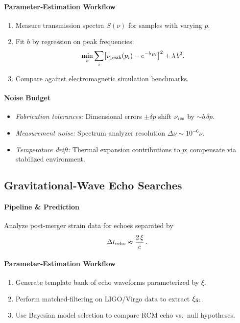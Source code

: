 \paragraph{Parameter‐Estimation Workflow}
\begin{enumerate}
  \item Measure transmission spectra $S(\nu)$ for samples with varying $p$.
  \item Fit $b$ by regression on peak frequencies:  
  \[
    \min_{b}\sum_i\bigl[\nu_{\rm peak}(p_i)-e^{-b\,p_i}\bigr]^2 + \lambda\,b^2.
  \]
  \item Compare against electromagnetic simulation benchmarks.
\end{enumerate}
\paragraph{Noise Budget}
\begin{itemize}
  \item \emph{Fabrication tolerances:} Dimensional errors $\pm\delta p$ shift $\nu_{\rm res}$ by $\sim b\,\delta p$.  
  \item \emph{Measurement noise:} Spectrum analyzer resolution $\Delta\nu\sim10^{-6}\nu$.  
  \item \emph{Temperature drift:} Thermal expansion contributions to $p$; compensate via stabilized environment.
\end{itemize}

\subsection{Gravitational‐Wave Echo Searches}
\paragraph{Pipeline \& Prediction}
Analyze post‐merger strain data for echoes separated by  
\[
\Delta t_{\rm echo} \approx \frac{2\,\xi}{c}\,.
\]
\paragraph{Parameter‐Estimation Workflow}
\begin{enumerate}
  \item Generate template bank of echo waveforms parameterized by $\xi$.  
  \item Perform matched‐filtering on LIGO/Virgo data to extract $\xi_{\rm fit}$.  
  \item Use Bayesian model selection to compare RCM echo vs.\ null hypotheses.
\end{enumerate}
